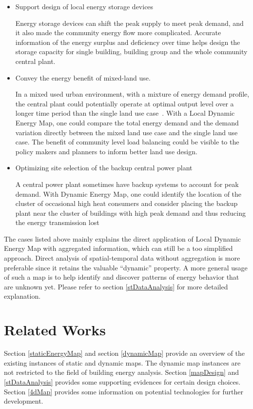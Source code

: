 \documentclass[hidelinks,12pt]{article}
\begin{document}
\begin{itemize}
\item Support design of local energy storage devices

  Energy storage devices can shift the peak supply to meet peak
  demand, and it also made the community energy flow more
  complicated. Accurate information of the energy surplus and
  deficiency over time helps design the storage capacity for single
  building, building group and the whole community central plant.

\item Convey the energy benefit of mixed-land use.

  In a mixed used urban environment, with a mixture of energy demand
  profile, the central plant could potentially operate at optimal
  output level over a longer time period than the single land use
  case~\cite{IDEA2005}. With a Local Dynamic Energy Map, one could
  compare the total energy demand and the demand variation directly
  between the mixed land use case and the single land use case. The
  benefit of community level load balancing could be visible to the
  policy makers and planners to inform better land use design.
  
\item Optimizing site selection of the backup central power plant

  A central power plant sometimes have backup systems to account for
  peak demand. With Dynamic Energy Map, one could identify the
  location of the cluster of occasional high heat consumers and
  consider placing the backup plant near the cluster of buildings with
  high peak demand and thus reducing the energy transmission lost

\end{itemize}
The cases listed above mainly explains the direct application of Local
Dynamic Energy Map with aggregated information, which can still be a
too simplified approach. Direct analysis of spatial-temporal data
without aggregation is more preferable since it retains the valuable
``dynamic'' property. A more general usage of such a map is to help
identify and discover patterns of energy behavior that are unknown
yet. Please refer to section \ref{stDataAnalysis} for more detailed
explanation.

\newpage
\section{Related Works}
Section \ref{staticEnergyMap} and section \ref{dynamicMap} provide an
overview of the existing instances of static and dynamic maps. The
dynamic map instances are not restricted to the field of building
energy analysis. Section \ref{mapDesign} and \ref{stDataAnalysis}
provides some supporting evidences for certain design choices. Section
\ref{4dMap} provides some information on potential technologies for
further development.
\end{document}
